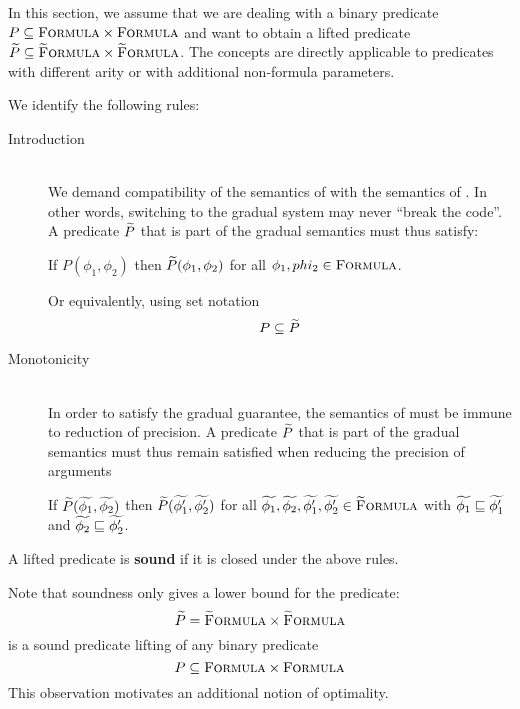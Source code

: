 In this section, we assume that we are dealing with a binary predicate $P \subseteq \textup{\textsc{Formula}} \times \textup{\textsc{Formula}}$ and want to obtain a lifted predicate $\widetilde{P} \subseteq \textup{\textsc{\ensuremath{\widetilde{\text{F}}}ormula}} \times \textup{\textsc{\ensuremath{\widetilde{\text{F}}}ormula}}$.
The concepts are directly applicable to predicates with different arity or with additional non-formula parameters.

We identify the following rules:
\begin{description}
    \item[Introduction]~\\
    We demand compatibility of the semantics of \gvl with the semantics of \svl.
    In other words, switching to the gradual system may never “break the code”.
    A predicate $\widetilde{P}$ that is part of the gradual semantics must thus satisfy:
    
    If $P(\phi_1, \phi_2)$ then $\widetilde{P}(\phi_1, \phi_2)$ for all $\phi_1, phi_2 \in \textup{\textsc{Formula}}$.
    
    Or equivalently, using set notation
    \begin{displaymath}
    P \subseteq \widetilde{P}
    \end{displaymath}
    
    \item[Monotonicity]~\\
    In order to satisfy the gradual guarantee, the semantics of \gvl must be immune to reduction of precision.
    A predicate $\widetilde{P}$ that is part of the gradual semantics must thus remain satisfied when reducing the precision of arguments
    
    If $\widetilde{P}(\widetilde{\phi_1}, \widetilde{\phi_2})$ then $\widetilde{P}(\widetilde{\phi_1'}, \widetilde{\phi_2'})$ for all $\widetilde{\phi_1}, \widetilde{\phi_2}, \widetilde{\phi_1'}, \widetilde{\phi_2'} \in \textup{\textsc{\ensuremath{\widetilde{\text{F}}}ormula}}$ with $\widetilde{\phi_1} \sqsubseteq \widetilde{\phi_1'}$ and $\widetilde{\phi_2} \sqsubseteq \widetilde{\phi_2'}$.
\end{description}

\begin{definition}
    A lifted predicate is \textbf{sound} if it is closed under the above rules.
\end{definition}

Note that soundness only gives a lower bound for the predicate:
$$\widetilde{P} = \textup{\textsc{\ensuremath{\widetilde{\text{F}}}ormula}} \times \textup{\textsc{\ensuremath{\widetilde{\text{F}}}ormula}}$$ is a sound predicate lifting of any binary predicate $$P \subseteq \textup{\textsc{Formula}} \times \textup{\textsc{Formula}}$$
This observation motivates an additional notion of optimality.

